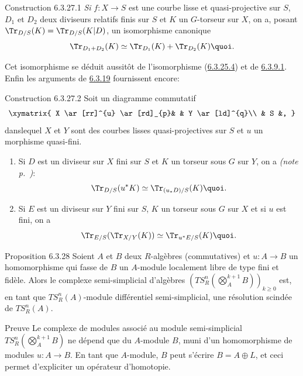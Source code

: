 \begin{enonce*}{Construction 6.3.27.1}
\emph{Si} $f:X\rightarrow S$ est une courbe lisse et quasi-projective
sur $S$, $D_{1}$ et $D_{2}$ deux diviseurs relatifs finis sur $S$ et
$K$ un $G$-torseur sur $X$, on a, posant
$\Tr_{D/S}(K)=\Tr_{D/S}(K|D)$, un isomorphisme canonique
$$
\Tr_{D_{1}+D_{2}}(K)\simeq \Tr_{D_{1}}(K)+\Tr_{D_{2}}(K){\quoi}.
$$
\end{enonce*}

\sisi{\noindent}{}%
Cet isomorphisme se déduit aussitôt de l'isomorphisme (\hyperref[XVII.par6.3.25.4]{6.3.25.4}) et de
\hyperref[XVII.lem6.3.9.1]{6.3.9.1}. Enfin les arguments de \hyperref[XVII.prop6.3.19]{6.3.19} fournissent encore:

\begin{enonce*}{Construction 6.3.27.2}
Soit un diagramme commutatif
$$
\xymatrix{
X   \ar[rr]^{u} \ar[rd]_{p}&     &  Y \ar[ld]^{q}\\
     &   S &,
}
$$
dans\pageoriginale lequel $X$ et $Y$ sont des courbes lisses
quasi-projectives sur $S$ et $u$ un morphisme quasi-fini.
\begin{enumerate}
\renewcommand{\theenumi}{\roman{enumi}}
\renewcommand{\labelenumi}{(\theenumi)}
\item Si $D$ est un diviseur sur $X$ fini sur $S$ et $K$ un torseur
sous $G$ sur $Y$, on a \emph{(\cf note p.~\pageref{XVII.note192})}:
$$
\Tr_{D/S}(u^{\ast}K)\simeq \Tr_{(u_{\ast}D)/S}(K){\quoi}.
$$

\item Si $E$ est un diviseur sur $Y$ fini sur $S$, $K$ un torseur sous
$G$ sur $X$ et si $u$ est fini, on a
$$
\Tr_{E/S}(\Tr_{X/Y}(K))\simeq \Tr_{u^{\ast}E/S}(K){\quoi}.
$$
\end{enumerate}
\end{enonce*}

\begin{enonce*}{Proposition 6.3.28}
Soient $A$ et $B$ deux $R$-algèbres (commutatives) et $u:A\rightarrow
B$ un homomorphisme qui fasse de $B$ un $A$-module localement libre de
type fini et fidèle. Alors le complexe semi-simplicial d'algèbres
$(TS^{n}_{R}(\bigotimes\limits^{k+1}_{A}B))_{k\geq 0}$
est, en tant que $TS^{n}_{R}(A)$-module différentiel semi-simplicial,
une résolution scindée de $TS^{n}_{R}(A)$.
\end{enonce*}

\begin{enonce*}[remark]{Preuve}
Le complexe de modules associé au module semi-simplicial
$TS^{n}_{R}(\bigotimes\limits^{k+1}_{A}B)$ ne dépend que
du $A$-module $B$, muni d'un homomorphisme de modules $u:A\rightarrow
B$. En tant que $A$-module, $B$ peut s'écrire $B=A\oplus L$, et ceci
permet d'expliciter un opérateur d'homotopie.
\end{enonce*}

